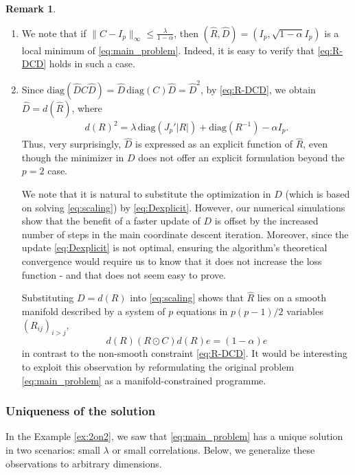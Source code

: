 \documentclass[12pt]{amsart}
\numberwithin{equation}{section}
\numberwithin{equation}{section}
\theoremstyle{plain}
\theoremstyle{definition}
\newtheorem{remark}{Remark}
\newcommand{\diag}[1]{\mathrm{diag}(#1)}
\begin{document}
\begin{remark}\label{rem:localI}
\begin{enumerate}
    \item We note that if $\|C-I_p\|_{\infty}\leq\frac{\lambda}{1-\alpha}$, then $(\hat{R},\hat{D}) = (I_p,\sqrt{1-\alpha}I_p)$ is a local minimum of \eqref{eq:main_problem}. Indeed, it is easy to verify that \eqref{eq:R-DCD} holds in such a case.
    \item Since $\diag{\hat{D}C\hat{D}} = \hat{D}\,\diag{C}\hat{D}=\hat{D}^2$, by \eqref{eq:R-DCD}, we obtain $\hat{D} = d(\hat{R})$, where
\begin{align}\label{eq:Dexplicit}
d(R)^2 = \lambda \,\diag{J_p' |R|} + \diag{R^{-1}}-\alpha I_p.
\end{align}
Thus, very surprisingly, $\hat{D}$ is expressed as an explicit function of $\hat{R}$, even though the minimizer in $D$ does not offer an explicit formulation beyond the $p=2$ case. 

 We note that it is natural to substitute the optimization in $D$ (which is based on solving \eqref{eq:scaling}) by  \eqref{eq:Dexplicit}. However, our numerical simulations show that the benefit of a faster update of $D$ is offset by the increased number of steps in the main coordinate descent iteration. Moreover, since the update \eqref{eq:Dexplicit} is not optimal, ensuring the algorithm's theoretical convergence would require us to know that it does not increase the loss function - and that does not seem easy to prove.

Substituting $D=d(R)$ into \eqref{eq:scaling} shows that $\hat{R}$ lies on a smooth manifold described by a system of $p$ equations in $p(p-1)/2$ variables $(R_{ij})_{i>j}$, 
\[
d(R) (R\odot C) d(R) e = (1-\alpha)e
\]
in contrast to the non‑smooth constraint \eqref{eq:R-DCD}. It would be interesting to exploit this observation by reformulating the original problem \eqref{eq:main_problem} as a manifold-constrained programme.
\end{enumerate}

\end{remark}




\subsubsection{Uniqueness of the solution}\label{sec:unique}

In the Example \ref{ex:2on2}, we saw that \eqref{eq:main_problem} has a unique solution in two scenarios:  small $\lambda$ or small correlations.
Below, we generalize these observations to arbitrary dimensions.
\end{document}
